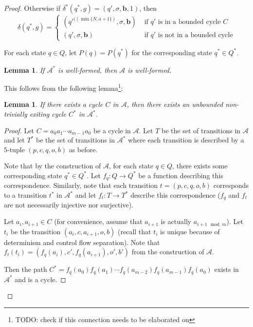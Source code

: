 \documentclass[12pt]{article}
\newtheorem{lemma}[thm]{Lemma}
\theoremstyle{definition}
\begin{document}
\begin{proof}
Otherwise if $\delta^*(q^*, g) = (q', \sigma, \mathbf{b}, 1)$, then 
\[\delta(q^*, g) = \begin{cases}
(q'^{((\min\{N, a+1\})}, \sigma, \mathbf{b}) & \text{ if }q' \text{ is in a  bounded cycle } C \\
(q', \sigma, \mathbf{b}) & \text{ if }q' \text{ is not in a bounded cycle}
\end{cases}\]

For each state $q\in Q$, let $P(q) = P(q^*)$ for the corresponding state $q^*\in Q^*$.


\begin{lemma}
	If $\mathcal{A}^*$ is well-formed, then $\mathcal{A}$ is well-formed.	
\end{lemma}

This follows from the following lemma\footnote{TODO: check if this connection needs to be elaborated on}: 

\begin{lemma}
	If there exists a cycle $C$ in $\mathcal{A}$, then there exists an unbounded non-trivially exiting cycle $C^*$ in $\mathcal{A}^*$.
\end{lemma}

\begin{proof}

	Let $C = a_0a_1\cdots a_{m-1}a_0$ be a cycle in $\mathcal{A}$. Let $T$ be the set of transitions in $\mathcal{A}$ and let $T^*$ be the set of transitions in $\mathcal{A}^*$ where each transition is described by a 5-tuple $(p, c, q, o, b)$ as before.
	
	Note that by the construction of $\mathcal{A}$, for each state $q\in Q$, there exists some corresponding state $q^*\in Q^*$. Let $f_q: Q\to Q^*$ be a function describing this correspondence. Similarly, note that each transition $t = (p, c, q, o, b)$ corresponds to a transition $t^*$ in $\mathcal{A}^*$ and let $f_t:T\to T^*$ describe this correspondence ($f_q$ and $f_t$ are not necessarily injective nor surjective). 
	
	Let $a_i, a_{i+1} \in C$ (for convenience, assume that $a_{i+1}$ is actually $a_{i+1 \mod m}$). Let $t_i$ be the transition $(a_i, c, a_{i+1}, o, b)$ (recall that $t_i$ is unique because of determinism and control flow separation). Note that $f_t(t_i) = (f_q(a_i), c', f_q(a_{i+1}), o', b')$ from the construction of $\mathcal{A}$.

	Then the path $C^* = f_q(a_0)f_q(a_1)\cdots f_q(a_{m-2})f_q(a_{m-1})f_q(a_0)$ exists in $\mathcal{A}^*$ and is a cycle.


\end{proof}
\end{proof}
\end{document}
